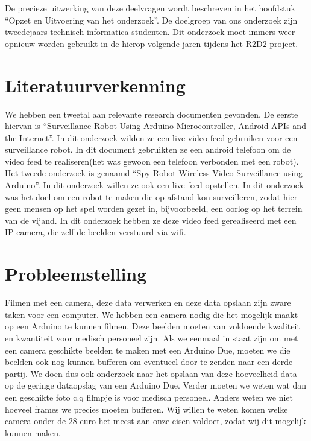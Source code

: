\documentclass{article}
\begin{document}
De precieze uitwerking van deze deelvragen wordt beschreven in het hoofdstuk “Opzet en Uitvoering van het onderzoek”.
De doelgroep van ons onderzoek zijn tweedejaars technisch informatica studenten. Dit onderzoek moet immers weer opnieuw worden gebruikt in de hierop volgende jaren tijdens het R2D2 project.


\section{Literatuurverkenning}
We hebben een tweetal aan relevante research documenten gevonden.
De eerste hiervan is “Surveillance Robot Using Arduino Microcontroller, Android APIs and the Internet”. In dit onderzoek wilden ze een live video feed gebruiken voor een surveillance robot. In dit document gebruikten ze een android telefoon om de video feed te realiseren(het was gewoon een telefoon verbonden met een robot). 
Het tweede onderzoek is genaamd “Spy Robot Wireless Video Surveillance using Arduino”. 
In dit onderzoek willen ze ook een live feed opstellen. In dit onderzoek was het doel om een robot te maken die op afstand kon surveilleren, zodat hier geen mensen op het spel worden gezet in, bijvoorbeeld, een oorlog op het terrein van de vijand. 
In dit onderzoek hebben ze deze video feed gerealiseerd met een IP-camera, die zelf de beelden verstuurd via wifi. 

\section{Probleemstelling}
Filmen met een camera, deze data verwerken en deze data opslaan zijn zware taken voor een computer. We hebben een camera nodig die het mogelijk maakt op een Arduino te kunnen filmen. Deze beelden moeten van voldoende kwaliteit en kwantiteit voor medisch personeel zijn. Als we eenmaal in staat zijn om met een camera geschikte beelden te maken met een Arduino Due, moeten we die beelden ook nog kunnen bufferen om eventueel door te zenden naar een derde partij. We doen dus ook onderzoek naar het opslaan van deze hoeveelheid data op de geringe dataopslag van een Arduino Due. Verder moeten we weten wat dan een geschikte foto c.q filmpje is voor medisch personeel. Anders weten we niet hoeveel frames we precies moeten bufferen. Wij willen te weten komen welke camera onder de 28 euro het meest aan onze eisen voldoet, zodat wij dit mogelijk kunnen maken. 

\end{document}
